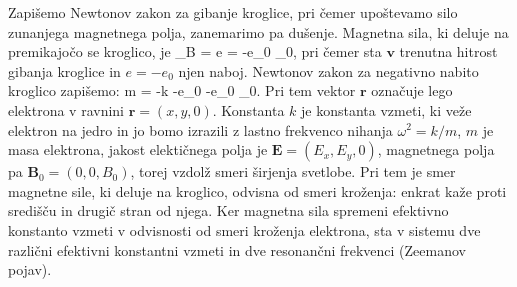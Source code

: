 Zapišemo Newtonov zakon za gibanje kroglice,
pri čemer upoštevamo silo zunanjega magnetnega polja, zanemarimo pa dušenje. 
Magnetna sila, ki deluje na premikajočo se kroglico, je 
\beq
{}_B = e \times {} = -e_0 \times {}_0,
\label{eq:09_52}
\eeq
pri čemer sta $\mathbf{v}$ trenutna hitrost gibanja kroglice in $e = -e_0$
njen naboj. Newtonov zakon za negativno nabito kroglico zapišemo:
\beq
m = -k -e_0  -e_0 \times {}_0.
\label{eq:09_55}
\eeq
Pri tem vektor $\mathbf{r}$ označuje lego elektrona v ravnini $\mathbf{r} = (x,y,0)$. Konstanta
$k$ je konstanta vzmeti, ki veže elektron na jedro in  jo bomo izrazili z lastno frekvenco 
nihanja $\omega^2 = k/m$, $m$ je masa elektrona, jakost elektičnega polja je $\mathbf{E} = (E_x, E_y, 0)$,
magnetnega polja pa $\mathbf{B}_0 = (0,0,B_0)$, torej vzdolž smeri širjenja svetlobe. 
Pri tem je smer magnetne sile, ki deluje na kroglico, odvisna od smeri kroženja: 
enkrat kaže proti središču in drugič stran od njega. Ker magnetna sila spremeni
efektivno konstanto vzmeti v odvisnosti od smeri kroženja elektrona, sta v sistemu
dve različni efektivni konstantni vzmeti in dve resonančni frekvenci (Zeemanov pojav).

